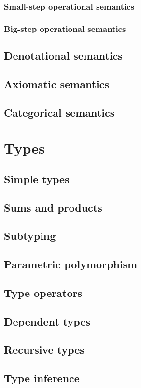 \documentclass[ebook,oneside]{memoir}
\begin{document}
      \section{Small-step operational semantics}

      \section{Big-step operational semantics}

    \chapter{Denotational semantics}

    \chapter{Axiomatic semantics}

    \chapter{Categorical semantics}

  \part{Types}

    \chapter{Simple types}

    \chapter{Sums and products}

    \chapter{Subtyping}

    \chapter{Parametric polymorphism}

    \chapter{Type operators}

    \chapter{Dependent types}

    \chapter{Recursive types}

    \chapter{Type inference}

  \backmatter


  \printbibliography[heading=bibintoc,title=References]

  \printindex
\end{document}
